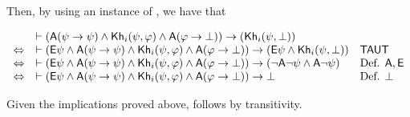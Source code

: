 %
Then, by using an instance of , we have that
\begin{spcenter}
\begin{small}
$\begin{array}{lll}
    & \vdash ({\sf A}(\psi \rightarrow \psi) \wedge {\sf Kh}_i(\psi,\varphi) \wedge {\sf A}(\varphi \rightarrow \bot)) \rightarrow ({\sf Kh}_i(\psi,\bot)) & \\
    \Leftrightarrow &  \vdash ({\sf E}\psi \wedge {\sf A}(\psi \rightarrow \psi) \wedge {\sf Kh}_i(\psi,\varphi) \wedge {\sf A}(\varphi \rightarrow \bot)) \rightarrow ({\sf E}\psi \wedge {\sf Kh}_i(\psi,\bot)) & \textsf{TAUT} \\
    \Leftrightarrow & \vdash ({\sf E}\psi \wedge {\sf A}(\psi \rightarrow \psi) \wedge {\sf Kh}_i(\psi,\varphi) \wedge {\sf A}(\varphi \rightarrow \bot)) \rightarrow (\neg{\sf A}\neg\psi \wedge {\sf A}\neg\psi) & \mbox{Def. } {\sf A},{\sf E} \\
    \Leftrightarrow & \vdash ({\sf E}\psi \wedge {\sf A}(\psi \rightarrow \psi) \wedge {\sf Kh}_i(\psi,\varphi) \wedge {\sf A}(\varphi \rightarrow \bot)) \rightarrow \bot & \mbox{Def. } \bot
\end{array}$
\end{small}
\end{spcenter}
%
%
Given the implications proved above,  follows by transitivity.

